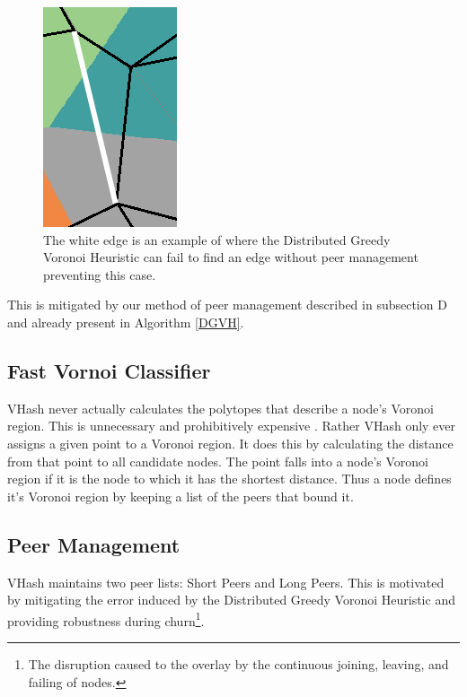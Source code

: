\documentclass{IEEEtran}
\begin{document}
\begin{figure}
	\centering
	\includegraphics[width=0.3\linewidth]{blocking-example2}
	\caption{The white edge is an example of where the Distributed Greedy Voronoi Heuristic can fail to find an edge without peer management preventing this case.}
	\label{occ-ex}
\end{figure}


This is mitigated by our method of peer management described in subsection D and already present in Algorithm \ref{DGVH}.


\subsection{Fast Vornoi Classifier}
VHash never actually calculates the polytopes that describe a node's Voronoi region.
This is unnecessary and prohibitively expensive \cite{raynet}.
Rather VHash only ever assigns a given point to a Voronoi region.
It does this by calculating the distance from that point to all candidate nodes.
The point falls into a node's Voronoi region if it is the node to which it has the shortest distance.
Thus a node defines it's Voronoi region by keeping a list of the peers that bound it.

\subsection{Peer Management}
VHash maintains two peer lists: Short Peers and Long Peers.
This is motivated by mitigating the error induced by the Distributed Greedy Voronoi Heuristic and providing robustness during churn\footnote{The disruption caused to the overlay by the continuous joining, leaving, and failing of nodes.}.
\end{document}
